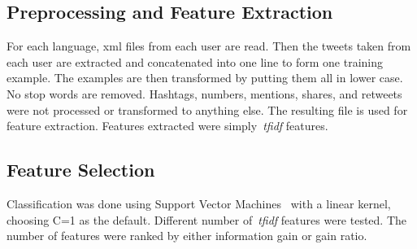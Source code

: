 \documentclass[a4paper]{llncs}
\begin{document}
\subsection{Preprocessing and Feature Extraction}
For each language, xml files from each user are read. Then the tweets taken from each user are extracted and concatenated into one line to form one training example. The examples are then transformed by putting them all in lower case. No stop words are removed. Hashtags, numbers, mentions, shares, and retweets were not processed or transformed to anything else. The resulting file is used for feature extraction.  Features extracted were simply~\textit{tfidf} features.  

\subsection{Feature Selection}
Classification was done using Support Vector Machines~\cite{cortes1995support} with a linear kernel, choosing C=1 as the default. Different number of~\textit{tfidf} features were tested. The number of features were ranked by either information gain or gain ratio. 
\end{document}
